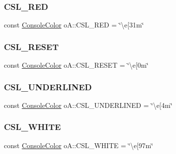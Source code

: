 \subsubsection{\texorpdfstring{C\+S\+L\+\_\+\+R\+ED}{CSL\_RED}}
{\footnotesize\ttfamily const \mbox{\hyperlink{namespaceo_a_a747e07c1977a29f3e1d38683043ec927}{Console\+Color}} o\+A\+::\+C\+S\+L\+\_\+\+R\+ED = \char`\"{}\textbackslash{}e\mbox{[}31m\char`\"{}\hspace{0.3cm}{\ttfamily [inline]}}

\mbox{\label{namespaceo_a_aac7099bbaefc25658bb46b9b3fa82c2d}} 
\subsubsection{\texorpdfstring{C\+S\+L\+\_\+\+R\+E\+S\+ET}{CSL\_RESET}}
{\footnotesize\ttfamily const \mbox{\hyperlink{namespaceo_a_a747e07c1977a29f3e1d38683043ec927}{Console\+Color}} o\+A\+::\+C\+S\+L\+\_\+\+R\+E\+S\+ET = \char`\"{}\textbackslash{}e\mbox{[}0m\char`\"{}\hspace{0.3cm}{\ttfamily [inline]}}

\mbox{\label{namespaceo_a_a04b311941fb36f55f96d366c3cd73152}} 
\subsubsection{\texorpdfstring{C\+S\+L\+\_\+\+U\+N\+D\+E\+R\+L\+I\+N\+ED}{CSL\_UNDERLINED}}
{\footnotesize\ttfamily const \mbox{\hyperlink{namespaceo_a_a747e07c1977a29f3e1d38683043ec927}{Console\+Color}} o\+A\+::\+C\+S\+L\+\_\+\+U\+N\+D\+E\+R\+L\+I\+N\+ED = \char`\"{}\textbackslash{}e\mbox{[}4m\char`\"{}\hspace{0.3cm}{\ttfamily [inline]}}

\mbox{\label{namespaceo_a_a4afb55957ed6dcda70e81d6dd8f07885}} 
\subsubsection{\texorpdfstring{C\+S\+L\+\_\+\+W\+H\+I\+TE}{CSL\_WHITE}}
{\footnotesize\ttfamily const \mbox{\hyperlink{namespaceo_a_a747e07c1977a29f3e1d38683043ec927}{Console\+Color}} o\+A\+::\+C\+S\+L\+\_\+\+W\+H\+I\+TE = \char`\"{}\textbackslash{}e\mbox{[}97m\char`\"{}\hspace{0.3cm}{\ttfamily [inline]}}

